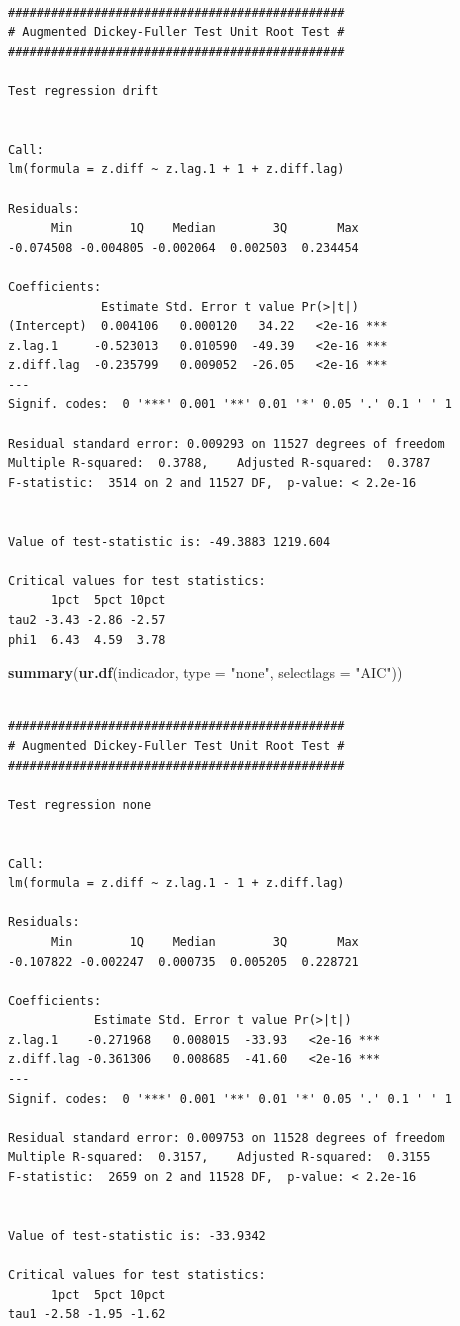 \documentclass[
  12pt]{article}
\newenvironment{Shaded}{\begin{snugshade}}{\end{snugshade}}
\newcommand{\AttributeTok}[1]{\textcolor[rgb]{0.13,0.29,0.53}{#1}}
\newcommand{\FunctionTok}[1]{\textcolor[rgb]{0.13,0.29,0.53}{\textbf{#1}}}
\newcommand{\NormalTok}[1]{#1}
\newcommand{\StringTok}[1]{\textcolor[rgb]{0.31,0.60,0.02}{#1}}
\begin{document}
\begin{verbatim}

############################################### 
# Augmented Dickey-Fuller Test Unit Root Test # 
############################################### 

Test regression drift 


Call:
lm(formula = z.diff ~ z.lag.1 + 1 + z.diff.lag)

Residuals:
      Min        1Q    Median        3Q       Max 
-0.074508 -0.004805 -0.002064  0.002503  0.234454 

Coefficients:
             Estimate Std. Error t value Pr(>|t|)    
(Intercept)  0.004106   0.000120   34.22   <2e-16 ***
z.lag.1     -0.523013   0.010590  -49.39   <2e-16 ***
z.diff.lag  -0.235799   0.009052  -26.05   <2e-16 ***
---
Signif. codes:  0 '***' 0.001 '**' 0.01 '*' 0.05 '.' 0.1 ' ' 1

Residual standard error: 0.009293 on 11527 degrees of freedom
Multiple R-squared:  0.3788,    Adjusted R-squared:  0.3787 
F-statistic:  3514 on 2 and 11527 DF,  p-value: < 2.2e-16


Value of test-statistic is: -49.3883 1219.604 

Critical values for test statistics: 
      1pct  5pct 10pct
tau2 -3.43 -2.86 -2.57
phi1  6.43  4.59  3.78
\end{verbatim}

\begin{Shaded}
\begin{Highlighting}[]
\FunctionTok{summary}\NormalTok{(}\FunctionTok{ur.df}\NormalTok{(indicador, }\AttributeTok{type =}  \StringTok{"none"}\NormalTok{, }
              \AttributeTok{selectlags =} \StringTok{"AIC"}\NormalTok{))}
\end{Highlighting}
\end{Shaded}

\begin{verbatim}

############################################### 
# Augmented Dickey-Fuller Test Unit Root Test # 
############################################### 

Test regression none 


Call:
lm(formula = z.diff ~ z.lag.1 - 1 + z.diff.lag)

Residuals:
      Min        1Q    Median        3Q       Max 
-0.107822 -0.002247  0.000735  0.005205  0.228721 

Coefficients:
            Estimate Std. Error t value Pr(>|t|)    
z.lag.1    -0.271968   0.008015  -33.93   <2e-16 ***
z.diff.lag -0.361306   0.008685  -41.60   <2e-16 ***
---
Signif. codes:  0 '***' 0.001 '**' 0.01 '*' 0.05 '.' 0.1 ' ' 1

Residual standard error: 0.009753 on 11528 degrees of freedom
Multiple R-squared:  0.3157,    Adjusted R-squared:  0.3155 
F-statistic:  2659 on 2 and 11528 DF,  p-value: < 2.2e-16


Value of test-statistic is: -33.9342 

Critical values for test statistics: 
      1pct  5pct 10pct
tau1 -2.58 -1.95 -1.62
\end{verbatim}
\end{document}

